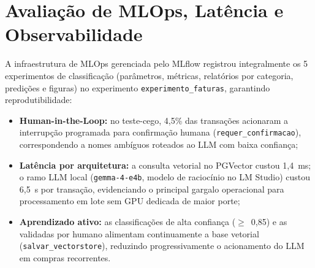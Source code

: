 \section{Avaliação de MLOps, Latência e Observabilidade}
\label{sec:val_mlops}

A infraestrutura de MLOps gerenciada pelo MLflow registrou integralmente os
5 experimentos de classificação
(parâmetros, métricas, relatórios por categoria, predições e figuras) no experimento
\texttt{experimento\_faturas}, garantindo reprodutibilidade:
\begin{itemize}
	\item \textbf{Human-in-the-Loop:} no teste-cego, 4,5\% das transações
	acionaram a interrupção programada para confirmação humana (\texttt{requer\_confirmacao}),
	correspondendo a nomes ambíguos roteados ao LLM com baixa confiança;
	\item \textbf{Latência por arquitetura:} a consulta vetorial no PGVector custou
	1,4~ms; o ramo LLM local (\texttt{gemma-4-e4b}, modelo de
	raciocínio no LM Studio) custou 6,5~s por
	transação, evidenciando o principal gargalo operacional para processamento em lote sem
	GPU dedicada de maior porte;
	\item \textbf{Aprendizado ativo:} as classificações de alta confiança ($\ge$~0,85) e
	as validadas por humano alimentam continuamente a base vetorial (\texttt{salvar\_vectorstore}),
	reduzindo progressivamente o acionamento do LLM em compras recorrentes.
\end{itemize}
